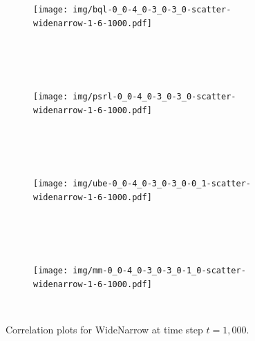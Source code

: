 \documentclass{article}
\begin{document}
\begin{appendices}
\clearpage

\begin{figure}[h!]
\centering
\begin{subfigure}{1.0\textwidth}
\texttt{[image: img/bql-0\_0-4\_0-3\_0-3\_0-scatter-widenarrow-1-6-1000.pdf]}
\end{subfigure}\\
~\\
~\\
\begin{subfigure}{1.0\textwidth}
\texttt{[image: img/psrl-0\_0-4\_0-3\_0-3\_0-scatter-widenarrow-1-6-1000.pdf]}
\end{subfigure}\\
~\\
~\\
\begin{subfigure}{1.0\textwidth}
\texttt{[image: img/ube-0\_0-4\_0-3\_0-3\_0-0\_1-scatter-widenarrow-1-6-1000.pdf]}
\end{subfigure}\\
~\\
~\\
\begin{subfigure}{1.0\textwidth}
\texttt{[image: img/mm-0\_0-4\_0-3\_0-3\_0-1\_0-scatter-widenarrow-1-6-1000.pdf]}
\end{subfigure}\\
\captionsetup{width=0.9\linewidth}
\caption{Correlation plots for WideNarrow at time step $t = 1,000$.}\label{correlations_widenarrow_500}
\end{figure}

\end{appendices}
\end{document}
